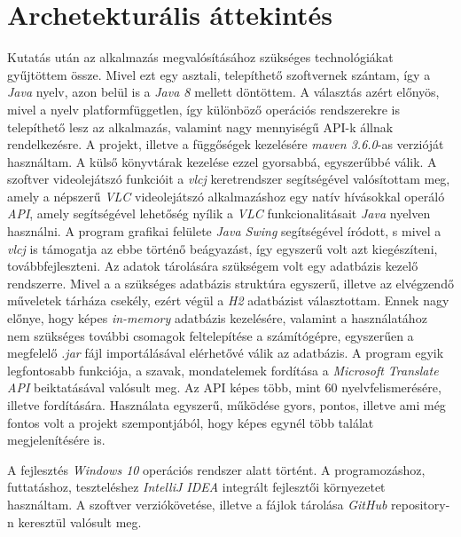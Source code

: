 \section{Archetekturális áttekintés}

Kutatás után az alkalmazás megvalósításához szükséges technológiákat gyűjtöttem össze. Mivel ezt egy asztali, telepíthető szoftvernek szántam, így a \textit{Java} nyelv, azon belül is a \textit{Java 8} mellett döntöttem. A választás azért előnyös, mivel a nyelv platformfüggetlen, így különböző operációs rendszerekre is telepíthető lesz az alkalmazás, valamint nagy mennyiségű API-k állnak rendelkezésre. A projekt, illetve a függőségek kezelésére \textit{maven 3.6.0}-as verzióját használtam. A külső könyvtárak kezelése ezzel  gyorsabbá, egyszerűbbé válik. A szoftver videolejátszó funkcióit a \textit{vlcj} keretrendszer segítségével valósítottam meg, amely a népszerű \textit{VLC} videolejátszó alkalmazáshoz egy natív hívásokkal operáló \textit{API}, amely segítségével lehetőség nyílik a \textit{VLC} funkcionalitásait \textit{Java} nyelven használni. A program grafikai felülete \textit{Java Swing} segítségével íródott, s mivel a \textit{vlcj} is támogatja az ebbe történő beágyazást, így egyszerű volt azt kiegészíteni, továbbfejleszteni. Az adatok tárolására szükségem volt egy adatbázis kezelő rendszerre. Mivel a a szükséges adatbázis struktúra egyszerű, illetve az elvégzendő műveletek tárháza csekély, ezért végül a \textit{H2} adatbázist választottam. Ennek nagy előnye, hogy képes \textit{in-memory} adatbázis kezelésére, valamint a használatához nem szükséges további csomagok feltelepítése a számítógépre, egyszerűen a megfelelő \textit{.jar} fájl importálásával elérhetővé válik az adatbázis. A program egyik legfontosabb funkciója, a szavak, mondatelemek fordítása a \textit{Microsoft Translate API} beiktatásával valósult meg. Az API képes több, mint 60 nyelvfelismerésére, illetve fordítására. Használata egyszerű, működése gyors, pontos, illetve ami még fontos volt a projekt szempontjából, hogy képes egynél több találat megjelenítésére is.

A fejlesztés \textit{Windows 10} operációs rendszer alatt történt. A programozáshoz, futtatáshoz, teszteléshez \textit{IntelliJ IDEA} integrált fejlesztői környezetet használtam. A szoftver verziókövetése, illetve a fájlok tárolása \textit{GitHub} repository-n keresztül valósult meg.
